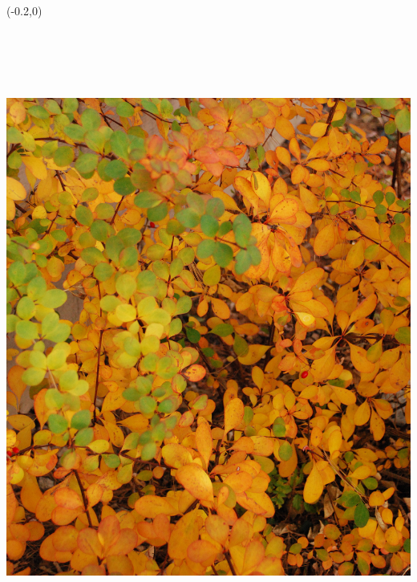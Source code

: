 \documentclass{article}
\begin{document}
\begin{textblock}{6.125}(-0.2,0)
\noindent\includegraphics[angle=90,height=8.25in,width=9.881in]{../../CoverImages/BackMain.jpg}
\end{textblock}
\end{document}
